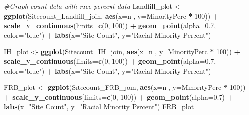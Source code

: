 \documentclass[12pt,]{article}
\newenvironment{Shaded}{\begin{snugshade}}{\end{snugshade}}
\newcommand{\KeywordTok}[1]{\textcolor[rgb]{0.13,0.29,0.53}{\textbf{#1}}}
\newcommand{\DataTypeTok}[1]{\textcolor[rgb]{0.13,0.29,0.53}{#1}}
\newcommand{\DecValTok}[1]{\textcolor[rgb]{0.00,0.00,0.81}{#1}}
\newcommand{\FloatTok}[1]{\textcolor[rgb]{0.00,0.00,0.81}{#1}}
\newcommand{\StringTok}[1]{\textcolor[rgb]{0.31,0.60,0.02}{#1}}
\newcommand{\CommentTok}[1]{\textcolor[rgb]{0.56,0.35,0.01}{\textit{#1}}}
\newcommand{\OperatorTok}[1]{\textcolor[rgb]{0.81,0.36,0.00}{\textbf{#1}}}
\newcommand{\NormalTok}[1]{#1}
\begin{document}
\begin{Shaded}
\begin{Highlighting}[]
\CommentTok{#Graph count data with race percent data}
\NormalTok{Landfill_plot <-}\StringTok{ }
\StringTok{  }\KeywordTok{ggplot}\NormalTok{(Sitecount_Landfill_join, }\KeywordTok{aes}\NormalTok{(}\DataTypeTok{x=}\NormalTok{n , }\DataTypeTok{y=}\NormalTok{MinorityPerc }\OperatorTok{*}\StringTok{ }\DecValTok{100}\NormalTok{)) }\OperatorTok{+}
\StringTok{  }\KeywordTok{scale_y_continuous}\NormalTok{(}\DataTypeTok{limits=}\KeywordTok{c}\NormalTok{(}\DecValTok{0}\NormalTok{, }\DecValTok{100}\NormalTok{)) }\OperatorTok{+}
\StringTok{  }\KeywordTok{geom_point}\NormalTok{(}\DataTypeTok{alpha=}\FloatTok{0.7}\NormalTok{, }\DataTypeTok{color=}\StringTok{"blue"}\NormalTok{) }\OperatorTok{+}
\StringTok{  }\KeywordTok{labs}\NormalTok{(}\DataTypeTok{x=}\StringTok{"Site Count"}\NormalTok{, }\DataTypeTok{y=}\StringTok{"Racial Minority Percent"}\NormalTok{)}

\NormalTok{IH_plot <-}\StringTok{ }
\StringTok{  }\KeywordTok{ggplot}\NormalTok{(Sitecount_IH_join, }\KeywordTok{aes}\NormalTok{(}\DataTypeTok{x=}\NormalTok{n , }\DataTypeTok{y=}\NormalTok{MinorityPerc }\OperatorTok{*}\StringTok{ }\DecValTok{100}\NormalTok{)) }\OperatorTok{+}
\StringTok{  }\KeywordTok{scale_y_continuous}\NormalTok{(}\DataTypeTok{limits=}\KeywordTok{c}\NormalTok{(}\DecValTok{0}\NormalTok{, }\DecValTok{100}\NormalTok{)) }\OperatorTok{+}
\StringTok{  }\KeywordTok{geom_point}\NormalTok{(}\DataTypeTok{alpha=}\FloatTok{0.7}\NormalTok{, }\DataTypeTok{color=}\StringTok{"blue"}\NormalTok{) }\OperatorTok{+}
\StringTok{  }\KeywordTok{labs}\NormalTok{(}\DataTypeTok{x=}\StringTok{"Site Count"}\NormalTok{, }\DataTypeTok{y=}\StringTok{"Racial Minority Percent"}\NormalTok{)}

\NormalTok{FRB_plot <-}\StringTok{ }
\StringTok{  }\KeywordTok{ggplot}\NormalTok{(Sitecount_FRB_join, }\KeywordTok{aes}\NormalTok{(}\DataTypeTok{x=}\NormalTok{n , }\DataTypeTok{y=}\NormalTok{MinorityPerc }\OperatorTok{*}\StringTok{ }\DecValTok{100}\NormalTok{)) }\OperatorTok{+}
\StringTok{  }\KeywordTok{scale_y_continuous}\NormalTok{(}\DataTypeTok{limits=}\KeywordTok{c}\NormalTok{(}\DecValTok{0}\NormalTok{, }\DecValTok{100}\NormalTok{)) }\OperatorTok{+}
\StringTok{  }\KeywordTok{geom_point}\NormalTok{(}\DataTypeTok{alpha=}\FloatTok{0.7}\NormalTok{) }\OperatorTok{+}
\StringTok{  }\KeywordTok{labs}\NormalTok{(}\DataTypeTok{x=}\StringTok{"Site Count"}\NormalTok{, }\DataTypeTok{y=}\StringTok{"Racial Minority Percent"}\NormalTok{)}
\NormalTok{FRB_plot}
\end{Highlighting}
\end{Shaded}
\end{document}
